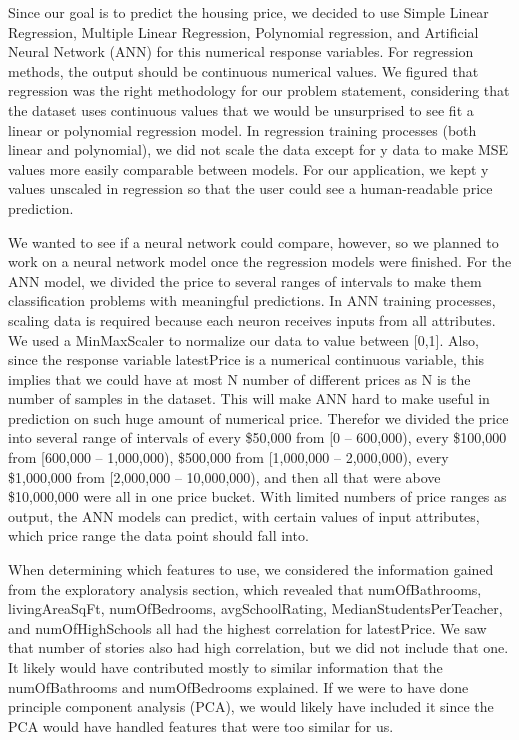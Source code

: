 \documentclass[12pt]{article}
\begin{document}
	Since our goal is to predict the housing price, we decided to use Simple Linear Regression, Multiple Linear Regression, Polynomial regression, and Artificial Neural Network (ANN) for this numerical response variables. For regression methods, the output should be continuous numerical values. We figured that regression was the right methodology for our problem statement, considering that the dataset uses continuous values that we would be unsurprised to see fit a linear or polynomial regression model. In regression training processes (both linear and polynomial), we did not scale the data except for y data to make MSE values more easily comparable between models. For our application, we kept y values unscaled in regression so that the user could see a human-readable price prediction.
	
	We wanted to see if a neural network could compare, however, so we planned to work on a neural network model once the regression models were finished. For the ANN model, we divided the price to several ranges of intervals to make them classification problems with meaningful predictions. In ANN training processes, scaling data is required because each neuron receives inputs from all attributes. We used a MinMaxScaler to normalize our data to value between [0,1]. Also, since the response variable latestPrice is a numerical continuous variable, this implies that we could have at most N number of different prices as N is the number of samples in the dataset. This will make ANN hard to make useful in prediction on such huge amount of numerical price. Therefor we divided the price into several range of intervals of every \$50,000 from [0 – 600,000), every \$100,000 from [600,000 – 1,000,000), \$500,000 from [1,000,000 – 2,000,000), every \$1,000,000 from [2,000,000 – 10,000,000), and then all that were above \$10,000,000 were all in one price bucket. With limited numbers of price ranges as output, the ANN models can predict, with certain values of input attributes, which price range the data point should fall into.
	
	When determining which features to use, we considered the information gained from the exploratory analysis section, which revealed that numOfBathrooms, livingAreaSqFt, numOfBedrooms, avgSchoolRating, MedianStudentsPerTeacher, and numOfHighSchools all had the highest correlation for latestPrice. We saw that number of stories also had high correlation, but we did not include that one. It likely would have contributed mostly to similar information that the numOfBathrooms and numOfBedrooms explained. If we were to have done principle component analysis (PCA), we would likely have included it since the PCA would have handled features that were too similar for us.
	
\end{document}
